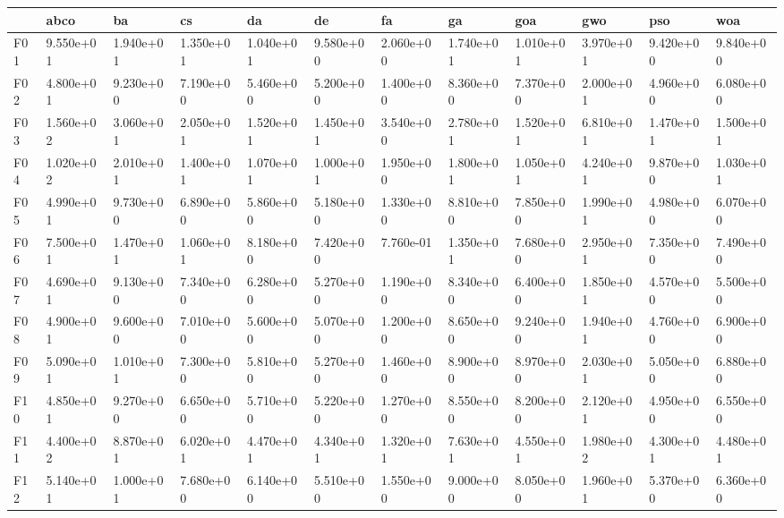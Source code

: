 \begin{table}
    \centering
    \begin{adjustbox}{width=\linewidth}
        \begin{tabular}{llllllllllll}
            \toprule
            {}   & abco      & ba        & cs        & da        & de        & fa        & ga        & goa       & gwo       & pso       & woa       \\
            \midrule
            F01  & 9.550e+01 & 1.940e+01 & 1.350e+01 & 1.040e+01 & 9.580e+00 & 2.060e+00 & 1.740e+01 & 1.010e+01 & 3.970e+01 & 9.420e+00 & 9.840e+00 \\
            F02  & 4.800e+01 & 9.230e+00 & 7.190e+00 & 5.460e+00 & 5.200e+00 & 1.400e+00 & 8.360e+00 & 7.370e+00 & 2.000e+01 & 4.960e+00 & 6.080e+00 \\
            F03  & 1.560e+02 & 3.060e+01 & 2.050e+01 & 1.520e+01 & 1.450e+01 & 3.540e+00 & 2.780e+01 & 1.520e+01 & 6.810e+01 & 1.470e+01 & 1.500e+01 \\
            F04  & 1.020e+02 & 2.010e+01 & 1.400e+01 & 1.070e+01 & 1.000e+01 & 1.950e+00 & 1.800e+01 & 1.050e+01 & 4.240e+01 & 9.870e+00 & 1.030e+01 \\
            F05  & 4.990e+01 & 9.730e+00 & 6.890e+00 & 5.860e+00 & 5.180e+00 & 1.330e+00 & 8.810e+00 & 7.850e+00 & 1.990e+01 & 4.980e+00 & 6.070e+00 \\
            F06  & 7.500e+01 & 1.470e+01 & 1.060e+01 & 8.180e+00 & 7.420e+00 & 7.760e-01 & 1.350e+01 & 7.680e+00 & 2.950e+01 & 7.350e+00 & 7.490e+00 \\
            F07  & 4.690e+01 & 9.130e+00 & 7.340e+00 & 6.280e+00 & 5.270e+00 & 1.190e+00 & 8.340e+00 & 6.400e+00 & 1.850e+01 & 4.570e+00 & 5.500e+00 \\
            F08  & 4.900e+01 & 9.600e+00 & 7.010e+00 & 5.600e+00 & 5.070e+00 & 1.200e+00 & 8.650e+00 & 9.240e+00 & 1.940e+01 & 4.760e+00 & 6.900e+00 \\
            F09  & 5.090e+01 & 1.010e+01 & 7.300e+00 & 5.810e+00 & 5.270e+00 & 1.460e+00 & 8.900e+00 & 8.970e+00 & 2.030e+01 & 5.050e+00 & 6.880e+00 \\
            F10  & 4.850e+01 & 9.270e+00 & 6.650e+00 & 5.710e+00 & 5.220e+00 & 1.270e+00 & 8.550e+00 & 8.200e+00 & 2.120e+01 & 4.950e+00 & 6.550e+00 \\
            F11  & 4.400e+02 & 8.870e+01 & 6.020e+01 & 4.470e+01 & 4.340e+01 & 1.320e+01 & 7.630e+01 & 4.550e+01 & 1.980e+02 & 4.300e+01 & 4.480e+01 \\
            F12  & 5.140e+01 & 1.000e+01 & 7.680e+00 & 6.140e+00 & 5.510e+00 & 1.550e+00 & 9.000e+00 & 8.050e+00 & 1.960e+01 & 5.370e+00 & 6.360e+00 \\

\end{tabular}
\end{adjustbox}
\end{table}
